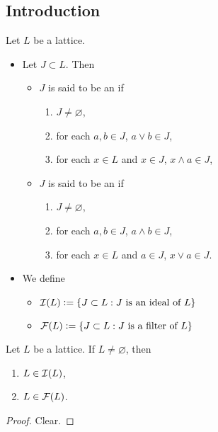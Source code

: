 \documentclass{book}
\begin{document}
	\subsection{Introduction}
	
	\begin{defn}
		Let $L$ be a lattice.  
		\begin{itemize}
			\item Let $J \subset L$. Then
			\begin{itemize}
				\item $J$ is said to be an  if 
				\begin{enumerate}
					\item $J \neq \varnothing$,
					\item for each $a,b \in J$, $a \vee b \in J$,
					\item for each $x \in L$ and $x \in J$, $x \wedge a \in J$,
				\end{enumerate}
				\item $J$ is said to be an  if 
				\begin{enumerate}
					\item $J \neq \varnothing$,
					\item for each $a,b \in J$, $a \wedge b \in J$,
					\item for each $x \in L$ and $a \in J$, $x \vee a \in J$.
				\end{enumerate}
			\end{itemize}
			\item We define 
			\begin{itemize}
				\item $\mathcal{I}(L) \vcentcolon= \{J \subset L: \text{$J$ is an ideal of $L$}\}$
				\item $\mathcal{F}(L) \vcentcolon= \{J \subset L: \text{$J$ is a filter of $L$}\}$
			\end{itemize}
		\end{itemize}
	\end{defn}
	
	\begin{ex}
		Let $L$ be a lattice. If $L \neq \varnothing$, then 
		\begin{enumerate}
			\item $L \in \mathcal{I}(L)$,
			\item $L \in \mathcal{F}(L)$.
		\end{enumerate}
	\end{ex}
	
	\begin{proof}
		Clear. 
	\end{proof}
	
\end{document}
